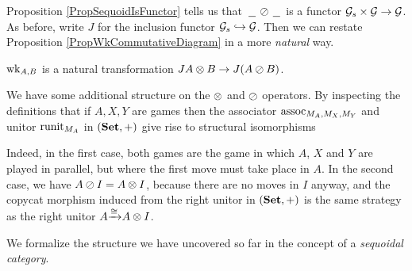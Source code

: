 \documentclass[11pt]{report}
\begin{document}
Proposition \ref{PropSequoidIsFunctor} tells us that $\,\underline{\hspace{1.5ex}}\,\oslash\,\underline{\hspace{1.5ex}}\,$ is a functor $\mathcal G_s\times\mathcal G\to \mathcal G$.  
As before, write $J$ for the inclusion functor $\mathcal G_s\hookrightarrow\mathcal G$.
Then we can restate Proposition \ref{PropWkCommutativeDiagram} in a more \emph{natural} way.

\begin{proposition}
  $\operatorname{wk}_{A,B}$ is a natural transformation $JA \otimes B \to J(A \oslash B)$.
  \label{PropWkNatural}
\end{proposition}

We have some additional structure on the $\otimes$ and $\oslash$ operators.  
By inspecting the definitions that if $A,X,Y$ are games then the associator $\operatorname{assoc}_{M_A,M_X,M_Y}$ and unitor $\operatorname{runit}_{M_A}$ in $({\normalfont\textbf{Set}},+)$ give rise to structural isomorphisms
Indeed, in the first case, both games are the game in which $A$, $X$ and $Y$ are played in parallel, but where the first move must take place in $A$.  
In the second case, we have $A\oslash I=A\otimes I$, because there are no moves in $I$ anyway, and the copycat morphism induced from the right unitor in $({\normalfont\textbf{Set}},+)$ is the same strategy as the right unitor $A {\xrightarrow{\cong}} A \otimes I$.

We formalize the structure we have uncovered so far in the concept of a \emph{sequoidal category}.
\end{document}
